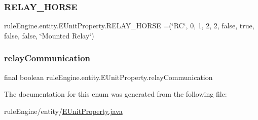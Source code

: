 \subsubsection{\texorpdfstring{R\+E\+L\+A\+Y\+\_\+\+H\+O\+R\+SE}{RELAY\_HORSE}}
{\footnotesize\ttfamily rule\+Engine.\+entity.\+E\+Unit\+Property.\+R\+E\+L\+A\+Y\+\_\+\+H\+O\+R\+SE =(\char`\"{}RC\char`\"{}, 0, 1, 2, 2, false, true, false, false, \char`\"{}Mounted Relay\char`\"{})}

\mbox{\label{enumrule_engine_1_1entity_1_1_e_unit_property_a327353bae2af8325edf677527355219c}} 
\subsubsection{\texorpdfstring{relay\+Communication}{relayCommunication}}
{\footnotesize\ttfamily final boolean rule\+Engine.\+entity.\+E\+Unit\+Property.\+relay\+Communication\hspace{0.3cm}{\ttfamily [private]}}



The documentation for this enum was generated from the following file\+:\begin{DoxyCompactItemize}
\item 
rule\+Engine/entity/\mbox{\hyperlink{_e_unit_property_8java}{E\+Unit\+Property.\+java}}\end{DoxyCompactItemize}
